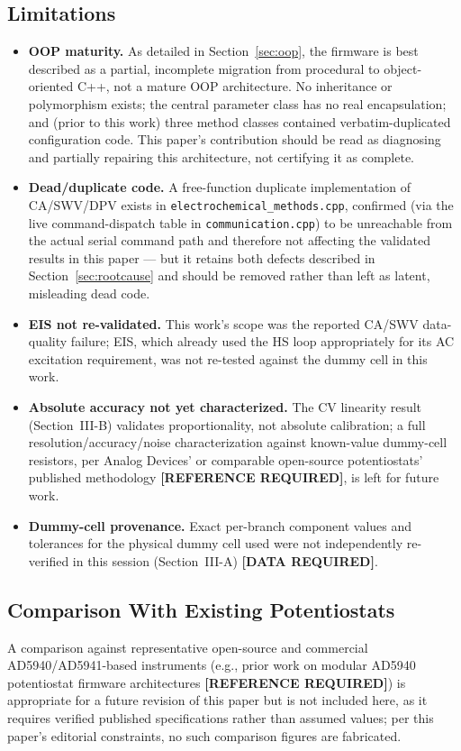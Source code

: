 \documentclass[journal]{IEEEtran}
\begin{document}
\subsection{Limitations}
\label{sec:limitations}
\begin{itemize}
\item \textbf{OOP maturity.} As detailed in Section~\ref{sec:oop}, the firmware is best described as a partial, incomplete migration from procedural to object-oriented C++, not a mature OOP architecture. No inheritance or polymorphism exists; the central parameter class has no real encapsulation; and (prior to this work) three method classes contained verbatim-duplicated configuration code. This paper's contribution should be read as diagnosing and partially repairing this architecture, not certifying it as complete.
\item \textbf{Dead/duplicate code.} A free-function duplicate implementation of CA/SWV/DPV exists in \texttt{electrochemical\_methods.cpp}, confirmed (via the live command-dispatch table in \texttt{communication.cpp}) to be unreachable from the actual serial command path and therefore not affecting the validated results in this paper --- but it retains both defects described in Section~\ref{sec:rootcause} and should be removed rather than left as latent, misleading dead code.
\item \textbf{EIS not re-validated.} This work's scope was the reported CA/SWV data-quality failure; EIS, which already used the HS loop appropriately for its AC excitation requirement, was not re-tested against the dummy cell in this work.
\item \textbf{Absolute accuracy not yet characterized.} The CV linearity result (Section~III-B) validates proportionality, not absolute calibration; a full resolution/accuracy/noise characterization against known-value dummy-cell resistors, per Analog Devices' or comparable open-source potentiostats' published methodology \textbf{[REFERENCE REQUIRED]}, is left for future work.
\item \textbf{Dummy-cell provenance.} Exact per-branch component values and tolerances for the physical dummy cell used were not independently re-verified in this session (Section~III-A) \textbf{[DATA REQUIRED]}.
\end{itemize}

\subsection{Comparison With Existing Potentiostats}
A comparison against representative open-source and commercial AD5940/AD5941-based instruments (e.g., prior work on modular AD5940 potentiostat firmware architectures \textbf{[REFERENCE REQUIRED]}) is appropriate for a future revision of this paper but is not included here, as it requires verified published specifications rather than assumed values; per this paper's editorial constraints, no such comparison figures are fabricated.
\end{document}
